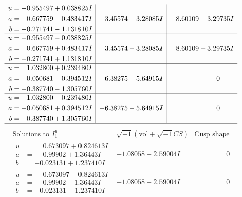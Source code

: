 \documentclass[1p]{elsarticle_modified}
\theoremstyle{definition}
\newcommand{\I}{\sqrt{-1}}
\begin{document}
$$\begin{array}{c|c|c}
\begin{aligned}
u &= -0.955497 + 0.038825 I \\
a &= \phantom{-}0.667759 - 0.483417 I \\
b &= -0.271741 - 1.131810 I\end{aligned}
 & \phantom{-}3.45574 + 3.28085 I & \phantom{-}8.60109 - 3.29735 I \\ \hline\begin{aligned}
u &= -0.955497 - 0.038825 I \\
a &= \phantom{-}0.667759 + 0.483417 I \\
b &= -0.271741 + 1.131810 I\end{aligned}
 & \phantom{-}3.45574 - 3.28085 I & \phantom{-}8.60109 + 3.29735 I \\ \hline\begin{aligned}
u &= \phantom{-}1.032800 + 0.239480 I \\
a &= -0.050681 - 0.394512 I \\
b &= -0.387740 - 1.305760 I\end{aligned}
 & -6.38275 + 5.64915 I & \phantom{-0.000000 } 0 \\ \hline\begin{aligned}
u &= \phantom{-}1.032800 - 0.239480 I \\
a &= -0.050681 + 0.394512 I \\
b &= -0.387740 + 1.305760 I\end{aligned}
 & -6.38275 - 5.64915 I & \phantom{-0.000000 } 0\\
 \hline 
 \end{array}$$\newpage$$\begin{array}{c|c|c}  
\text{Solutions to }I^u_{1}& \I (\text{vol} + \sqrt{-1}CS) & \text{Cusp shape}\\
 \hline 
\begin{aligned}
u &= \phantom{-}0.673097 + 0.824613 I \\
a &= \phantom{-}0.99902 + 1.36443 I \\
b &= -0.023131 + 1.237410 I\end{aligned}
 & -1.08058 - 2.59004 I & \phantom{-0.000000 } 0 \\ \hline\begin{aligned}
u &= \phantom{-}0.673097 - 0.824613 I \\
a &= \phantom{-}0.99902 - 1.36443 I \\
b &= -0.023131 - 1.237410 I\end{aligned}
 & -1.08058 + 2.59004 I & \phantom{-0.000000 } 0 \\ \hline\begin{aligned}

\end{aligned}
\end{array}$$
\end{document}
